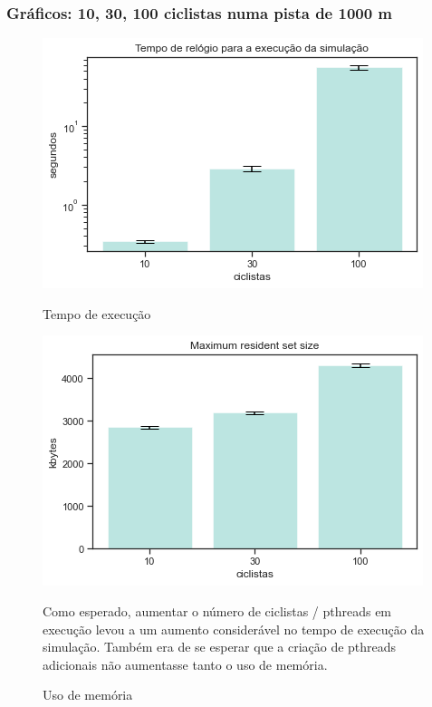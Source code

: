 \documentclass{beamer}
\begin{document}
\begin{frame}
\frametitle{Gráficos: 10, 30, 100 ciclistas numa pista de 1000 m}


\begin{figure}[!htb]
  \includegraphics[width=\linewidth]{imgs/ciclistas_tempo}
  \caption{Tempo de execução}\label{fig:awesome_image1}
\endminipage\hfill
{}
  \includegraphics[width=\linewidth]{imgs/ciclistas_memoria}
  \caption{Uso de memória}\label{fig:awesome_image2}
  \endminipage\hfill

Como esperado, aumentar o número de ciclistas / pthreads em execução levou a um aumento considerável no tempo de execução da simulação. Também era de se esperar que a criação de pthreads adicionais não aumentasse tanto o uso de memória. 
\end{figure}

\end{frame}
\end{document}
